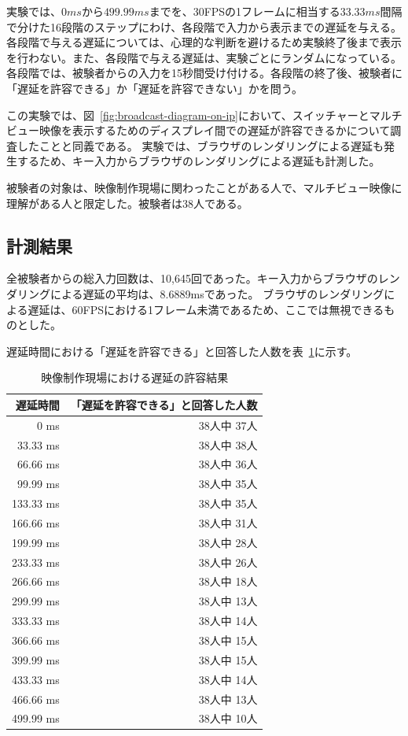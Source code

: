 \newpage
実験では、$0ms$から$499.99ms$までを、30FPSの1フレームに相当する$33.33ms$間隔で分けた16段階のステップにわけ、各段階で入力から表示までの遅延を与える。
各段階で与える遅延については、心理的な判断を避けるため実験終了後まで表示を行わない。また、各段階で与える遅延は、実験ごとにランダムになっている。
各段階では、被験者からの入力を15秒間受け付ける。各段階の終了後、被験者に「遅延を許容できる」か「遅延を許容できない」かを問う。

この実験では、図~\ref{fig:broadcast-diagram-on-ip}において、スイッチャーとマルチビュー映像を表示するためのディスプレイ間での遅延が許容できるかについて調査したことと同義である。
実験では、ブラウザのレンダリングによる遅延も発生するため、キー入力からブラウザのレンダリングによる遅延も計測した。

被験者の対象は、映像制作現場に関わったことがある人で、マルチビュー映像に理解がある人と限定した。被験者は38人である。

\subsection{計測結果}

全被験者からの総入力回数は、10,645回であった。キー入力からブラウザのレンダリングによる遅延の平均は、8.6889msであった。
ブラウザのレンダリングによる遅延は、60FPSにおける1フレーム未満であるため、ここでは無視できるものとした。

遅延時間における「遅延を許容できる」と回答した人数を表~\ref{tb:mv-delay-result}に示す。

\begin{table}[htbp]
  \caption{映像制作現場における遅延の許容結果}
  \label{tb:mv-delay-result}
  \begin{center}
  \begin{tabular}{r|r}
    \hline
    遅延時間   & 「遅延を許容できる」と回答した人数 \\\hline\hline
    0 ms      & 38人中 37人 \\\hline
    33.33 ms  & 38人中 38人 \\\hline
    66.66 ms  & 38人中 36人 \\\hline
    99.99 ms  & 38人中 35人 \\\hline
    133.33 ms & 38人中 35人 \\\hline
    166.66 ms & 38人中 31人 \\\hline
    199.99 ms & 38人中 28人 \\\hline
    233.33 ms & 38人中 26人 \\\hline
    266.66 ms & 38人中 18人 \\\hline
    299.99 ms & 38人中 13人 \\\hline
    333.33 ms & 38人中 14人 \\\hline
    366.66 ms & 38人中 15人 \\\hline
    399.99 ms & 38人中 15人 \\\hline
    433.33 ms & 38人中 14人 \\\hline
    466.66 ms & 38人中 13人 \\\hline
    499.99 ms & 38人中 10人 \\\hline
  \end{tabular}\end{center}
\end{table}

